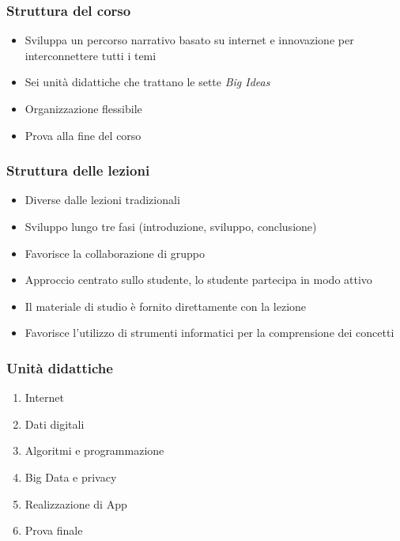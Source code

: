 \documentclass{beamer}
\begin{document}
\begin{frame}
  \frametitle{Struttura del corso}

  \begin{itemize}
    \item Sviluppa un percorso narrativo basato su internet e innovazione per interconnettere tutti i temi
    \item Sei unità didattiche che trattano le sette \emph{Big Ideas}
    \item Organizzazione flessibile
    \item Prova alla fine del corso
  \end{itemize}
\end{frame}

\begin{frame}
  \frametitle{Struttura delle lezioni}

  \begin{itemize}
    \item Diverse dalle lezioni tradizionali
    \item Sviluppo lungo tre fasi (introduzione, sviluppo, conclusione)
    \item Favorisce la collaborazione di gruppo
    \item Approccio centrato sullo studente, lo studente partecipa in modo attivo
    \item Il materiale di studio è fornito direttamente con la lezione
    \item Favorisce l'utilizzo di strumenti informatici per la comprensione dei concetti
  \end{itemize}
\end{frame}

\begin{frame}
  \frametitle{Unità didattiche}

  \begin{enumerate}
    \item Internet
    \item Dati digitali
    \item Algoritmi e programmazione
    \item Big Data e privacy
    \item Realizzazione di App
    \item Prova finale
  \end{enumerate}
\end{frame}
\end{document}
